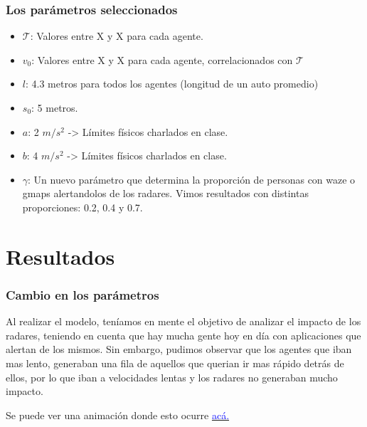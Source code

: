 \documentclass[10pt, compress]{beamer}
\begin{document}
\begin{frame}[fragile]

\frametitle{Los par\'ametros seleccionados}

\begin{itemize}

\item $\mathcal{T}$: Valores entre X y X para cada agente.
\item $v_0$: Valores entre X y X para cada agente, correlacionados con $\mathcal{T}$
\item $l$: 4.3 metros para todos los agentes (longitud de un auto promedio)
\item $s_0$: 5 metros.
\item $a$: 2 $m/s^2$ -> Límites físicos charlados en clase.
\item $b$: 4 $m/s^2$ -> Límites físicos charlados en clase.
\item $\gamma$: Un nuevo par\'ametro que determina la proporci\'on de personas con waze o gmaps alertandolos de los radares. Vimos resultados con distintas proporciones: 0.2, 0.4 y 0.7.

\end{itemize}

\end{frame}

\section{Resultados}

\begin{frame}
\frametitle{Cambio en los par\'ametros}

Al realizar el modelo, ten\'iamos en mente el objetivo de analizar el impacto de los radares, teniendo en cuenta que hay mucha gente hoy en d\'ia con aplicaciones que alertan de los mismos. Sin embargo, pudimos observar que los agentes que iban mas lento, generaban una fila de aquellos que querian ir mas r\'apido detr\'as de ellos, por lo que iban a velocidades lentas y los radares no generaban mucho impacto.

Se puede ver una animaci\'on donde esto ocurre \href{https://youtu.be/NnljPUTmnGE}{\textcolor{blue}{ac\'a.}}

\end{frame}
\end{document}
